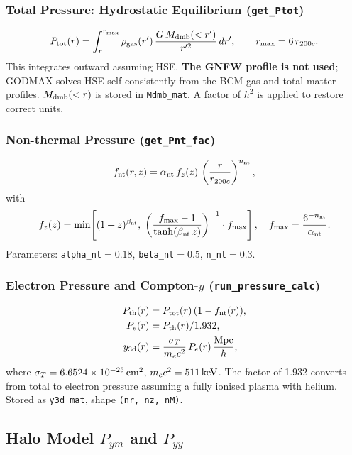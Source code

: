 \documentclass[12pt,a4paper]{article}
\newcommand{\code}[1]{\texttt{\small #1}}
\newcommand{\param}[1]{\texttt{\small #1}}
\begin{document}
\subsubsection{Total Pressure: Hydrostatic Equilibrium (\code{get\_Ptot})}
\begin{equation}
  P_{\rm tot}(r) = \int_r^{r_{\rm max}} \rho_{\rm gas}(r')\,
  \frac{G\,M_{\rm dmb}(<r')}{r'^2}\,dr',
  \qquad r_{\rm max} = 6\,r_{200c}.
\end{equation}
This integrates outward assuming HSE.
\textbf{The GNFW profile is not used}; GODMAX solves HSE self-consistently from the
BCM gas and total matter profiles. $M_{\rm dmb}(<r)$ is stored in \code{Mdmb\_mat}.
A factor of $h^2$ is applied to restore correct units.

\subsubsection{Non-thermal Pressure (\code{get\_Pnt\_fac})}
\begin{equation}
  f_{\rm nt}(r,z) = \alpha_{\rm nt}\,f_z(z)\,
  \left(\frac{r}{r_{200c}}\right)^{n_{\rm nt}},
\end{equation}
with
\begin{equation}
  f_z(z) = \min\!\left[(1+z)^{\beta_{\rm nt}},\;
  \left(\frac{f_{\rm max}-1}{\tanh(\beta_{\rm nt}\,z)}\right)^{-1}\cdot f_{\rm max}\right],
  \quad f_{\rm max} = \frac{6^{-n_{\rm nt}}}{\alpha_{\rm nt}}.
\end{equation}
Parameters: \param{alpha\_nt}$=0.18$, \param{beta\_nt}$=0.5$, \param{n\_nt}$=0.3$.

\subsubsection{Electron Pressure and Compton-$y$ (\code{run\_pressure\_calc})}
\begin{align}
  P_{\rm th}(r) &= P_{\rm tot}(r)\,(1 - f_{\rm nt}(r)), \\
  P_e(r) &= P_{\rm th}(r) / 1.932, \\
  y_{\rm 3d}(r) &= \frac{\sigma_T}{m_e c^2}\,P_e(r)\,\frac{{\rm Mpc}}{h},
\end{align}
where $\sigma_T=6.6524\times10^{-25}\,{\rm cm}^2$, $m_ec^2=511\,{\rm keV}$.
The factor of 1.932 converts from total to electron pressure assuming a fully
ionised plasma with helium. Stored as \code{y3d\_mat}, shape \code{(nr, nz, nM)}.

\subsection{Halo Model $P_{ym}$ and $P_{yy}$}
\end{document}

